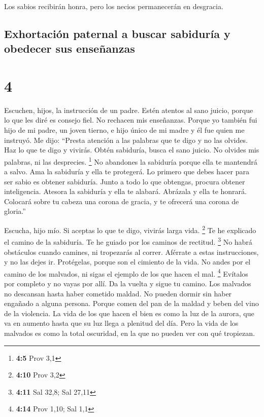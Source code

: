  Los sabios recibirán honra, pero los necios permanecerán
en desgracia.

\hypertarget{exhortaciuxf3n-paternal-a-buscar-sabiduruxeda-y-obedecer-sus-enseuxf1anzas}{%
\subsection{Exhortación paternal a buscar sabiduría y obedecer sus
enseñanzas}\label{exhortaciuxf3n-paternal-a-buscar-sabiduruxeda-y-obedecer-sus-enseuxf1anzas}}

\hypertarget{section-3}{%
\section{4}\label{section-3}}

 Escuchen, hijos, la instrucción de un padre. Estén atentos
al sano juicio,  porque lo que les diré es consejo fiel. No
rechacen mis enseñanzas.  Porque yo también fui hijo de mi
padre, un joven tierno, e hijo único de mi madre  y él fue
quien me instruyó. Me dijo: ``Presta atención a las palabras que te digo
y no las olvides. Haz lo que te digo y vivirás.  Obtén
sabiduría, busca el sano juicio. No olvides mis palabras, ni las
desprecies. \footnote{\textbf{4:5} Prov 3,1}  No abandones
la sabiduría porque ella te mantendrá a salvo. Ama la sabiduría y ella
te protegerá.  Lo primero que debes hacer para ser sabio es
obtener sabiduría. Junto a todo lo que obtengas, procura obtener
inteligencia.  Atesora la sabiduría y ella te alabará.
Abrázala y ella te honrará.  Colocará sobre tu cabeza una
corona de gracia, y te ofrecerá una corona de gloria.''

 Escucha, hijo mío. Si aceptas lo que te digo, vivirás
larga vida. \footnote{\textbf{4:10} Prov 3,2}  Te he
explicado el camino de la sabiduría. Te he guiado por los caminos de
rectitud. \footnote{\textbf{4:11} Sal 32,8; Sal 27,11}  No
habrá obstáculos cuando camines, ni tropezarás al correr. 
Aférrate a estas instrucciones, y no las dejes ir. Protégelas, porque
son el cimiento de la vida.  No andes por el camino de los
malvados, ni sigas el ejemplo de los que hacen el mal. \footnote{\textbf{4:14}
  Prov 1,10; Sal 1,1}  Evítalos por completo y no vayas por
allí. Da la vuelta y sigue tu camino.  Los malvados no
descansan hasta haber cometido maldad. No pueden dormir sin haber
engañado a alguna persona.  Porque comen del pan de la
maldad y beben del vino de la violencia.  La vida de los
que hacen el bien es como la luz de la aurora, que va en aumento hasta
que su luz llega a plenitud del día.  Pero la vida de los
malvados es como la total oscuridad, en la que no pueden ver con qué
tropiezan.

